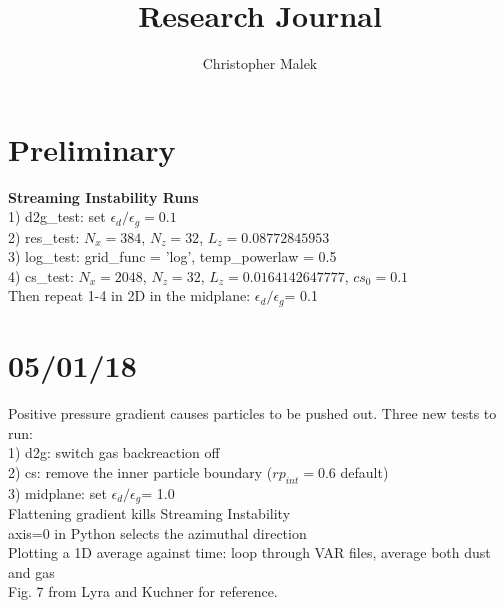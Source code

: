 \documentclass[10pt]{article}
\title{Research Journal}
\author{Christopher Malek}
\date{}
\newcommand{\edtog}{$\epsilon_{d}/\epsilon_{g}$}
\begin{document}
\maketitle
\section{Preliminary}
\textbf{Streaming Instability Runs}\\
1) d2g\_test: set $\epsilon_{d}/\epsilon_{g} = 0.1$\\
2) res\_test: $N_{x} = 384$, $N_{z} = 32$, $L_{z} = 0.08772845953$\\
3) log\_test: grid\_func = 'log', temp\_powerlaw = 0.5\\
4) cs\_test: $N_{x} = 2048$, $N_{z} = 32$, $L_{z} = 0.0164142647777$, $cs_{0} = 0.1$\\

\noindent Then repeat 1-4 in 2D in the midplane: \edtog = 0.1

\section{05/01/18}
Positive pressure gradient causes particles to be pushed out. Three new tests to run:\\
1) d2g: switch gas backreaction off\\
2) cs: remove the inner particle boundary ($rp_{int}=0.6$ default)\\
3) midplane: set \edtog = 1.0\\

\noindent Flattening gradient kills Streaming Instability\\
axis=0 in Python selects the azimuthal direction\\

Plotting a 1D average against time: loop through VAR files, average both dust and gas\\
\* Fig. 7 from Lyra and Kuchner for reference.\\
\end{document}
